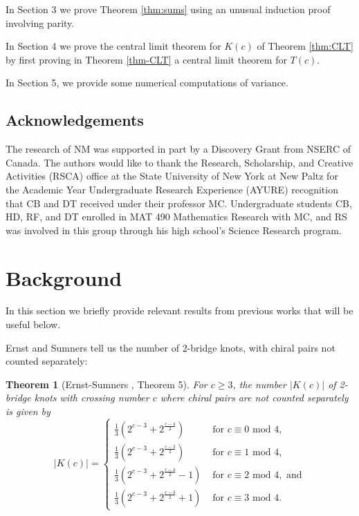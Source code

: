 \documentclass[11pt]{amsart}
\newtheorem{theorem}{Theorem}[section]
\theoremstyle{definition}
\theoremstyle{remark}
\numberwithin{equation}{section}
\begin{document}
In Section 3 we prove Theorem \ref{thm:sums} using an unusual induction proof involving parity.


In Section 4 we prove the central limit theorem for $K(c)$ of Theorem \ref{thm:CLT} by first proving in Theorem \ref{thm-CLT} a central limit theorem for $T(c)$.
 
In Section 5, we provide some numerical computations of variance.

\subsection*{Acknowledgements}  The research of NM was supported in part by a Discovery Grant from NSERC of Canada.  The authors would like to thank the Research, Scholarship, and Creative Activities (RSCA) office at the State University of New York at New Paltz for the Academic Year Undergraduate Research Experience (AYURE) recognition that CB and DT received under their professor MC.  Undergraduate students CB, HD, RF, and DT enrolled in MAT 490 Mathematics Research with MC, and RS was involved in this group through his high school's Science Research program.








\section{Background}

In this section we briefly provide relevant results from previous works that will be useful below.


Ernst and Sumners tell us the number of 2-bridge knots, with chiral pairs not counted separately:

\begin{theorem}[Ernst-Sumners \cite{ErnSum}, Theorem 5]
\label{thm:ernstsumners}
For $c\geq 3$, the number $|K(c)|$ of 2-bridge knots with crossing number $c$ where chiral pairs are \emph{not} counted separately is given by
\[
|K(c)| = 
\begin{cases}
\frac{1}{3}(2^{c-3}+2^{\frac{c-4}{2}}) & \text{ for } c\equiv 0 \text{ mod }4,\\
\frac{1}{3}(2^{c-3}+2^{\frac{c-3}{2}}) & \text{ for } c\equiv 1 \text{ mod }4, \\
\frac{1}{3}(2^{c-3}+2^{\frac{c-4}{2}}-1) & \text{ for } c\equiv 2 \text{ mod }4, \text{ and}\\
\frac{1}{3}(2^{c-3}+2^{\frac{c-3}{2}}+1) & \text{ for } c\equiv 3 \text{ mod }4.
\end{cases}
\]
\end{theorem}
\end{document}

